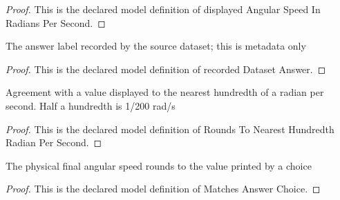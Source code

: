 \begin{proof}
  This is the declared model definition of displayed Angular Speed In Radians Per Second.
\end{proof}
\begin{definition}
  \label{def:physics:phyx-mini-0827:phyxminiproblems-problemphyxmini0827-recordeddatasetanswer}
  The answer label recorded by the source dataset; this is metadata only
\end{definition}
\begin{proof}
  This is the declared model definition of recorded Dataset Answer.
\end{proof}
\begin{definition}
  \label{def:physics:phyx-mini-0827:phyxminiproblems-problemphyxmini0827-roundstonearesthundredthradianpersecond}
  Agreement with a value displayed to the nearest hundredth of a radian per second. Half a hundredth is 1/200 rad/s
\end{definition}
\begin{proof}
  This is the declared model definition of Rounds To Nearest Hundredth Radian Per Second.
\end{proof}
\begin{definition}
  \label{def:physics:phyx-mini-0827:phyxminiproblems-problemphyxmini0827-matchesanswerchoice}
  The physical final angular speed rounds to the value printed by a choice
\end{definition}
\begin{proof}
  This is the declared model definition of Matches Answer Choice.
\end{proof}
